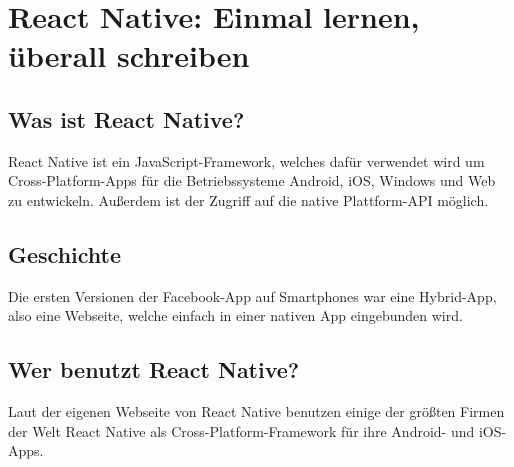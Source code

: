 \section{React Native: Einmal lernen, überall schreiben}
\label{reactnative}

\subsection{Was ist React Native?}
React Native ist ein JavaScript-Framework, welches dafür verwendet wird um Cross-Platform-Apps für
die Betriebssysteme Android, iOS, Windows und Web zu entwickeln.
Außerdem ist der Zugriff auf die native Plattform-API möglich.

\subsection{Geschichte}
Die ersten Versionen der Facebook-App auf Smartphones war eine Hybrid-App, also eine Webseite,
welche einfach in einer nativen App eingebunden wird.
\cite{reactNativeHistory}

\subsection{Wer benutzt React Native?}
Laut der eigenen Webseite von React Native benutzen einige der größten Firmen der Welt React Native
als Cross-Platform-Framework für ihre Android- und iOS-Apps.

